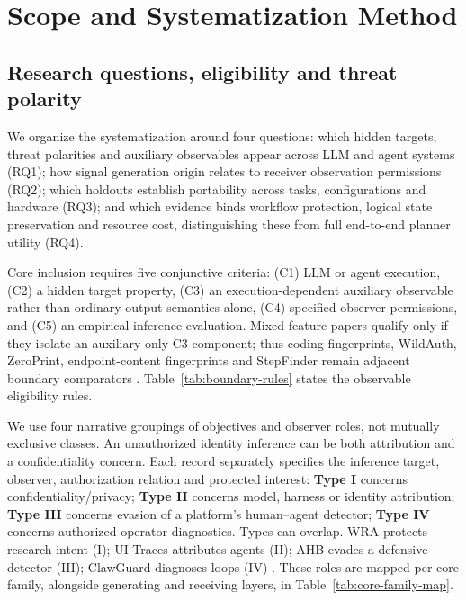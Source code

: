 \section{Scope and Systematization Method}\label{sec:methodology}\label{sec:background}
\subsection{Research questions, eligibility and threat polarity}
We organize the systematization around four questions: which hidden targets, threat polarities and auxiliary observables appear across LLM and agent systems (RQ1); how signal generation origin relates to receiver observation permissions (RQ2); which holdouts establish portability across tasks, configurations and hardware (RQ3); and which evidence binds workflow protection, logical state preservation and resource cost, distinguishing these from full end-to-end planner utility (RQ4).

Core inclusion requires five conjunctive criteria: (C1) LLM or agent execution, (C2) a hidden target property, (C3) an execution-dependent auxiliary observable rather than ordinary output semantics alone, (C4) specified observer permissions, and (C5) an empirical inference evaluation. Mixed-feature papers qualify only if they isolate an auxiliary-only C3 component; thus coding fingerprints, WildAuth, ZeroPrint, endpoint-content fingerprints and StepFinder remain adjacent boundary comparators \cite{ghaleb2026codingfingerprint,wang2026dialogue,shao2026zeroprint,leshin2026endpoint,zhu2026stepfinder}. Table~\ref{tab:boundary-rules} states the observable eligibility rules.


We use four narrative groupings of objectives and observer roles, not mutually exclusive classes. An unauthorized identity inference can be both attribution and a confidentiality concern. Each record separately specifies the inference target, observer, authorization relation and protected interest:
\textbf{Type I} concerns confidentiality/privacy; \textbf{Type II} concerns model, harness or identity attribution; \textbf{Type III} concerns evasion of a platform's human--agent detector; \textbf{Type IV} concerns authorized operator diagnostics. Types can overlap. WRA protects research intent (I); UI Traces attributes agents (II); AHB evades a defensive detector (III); ClawGuard diagnoses loops (IV) \cite{jeong2026wra,uitraces2026,zhu2026turing,gan2026clawguard}. These roles are mapped per core family, alongside generating and receiving layers, in Table~\ref{tab:core-family-map}.

